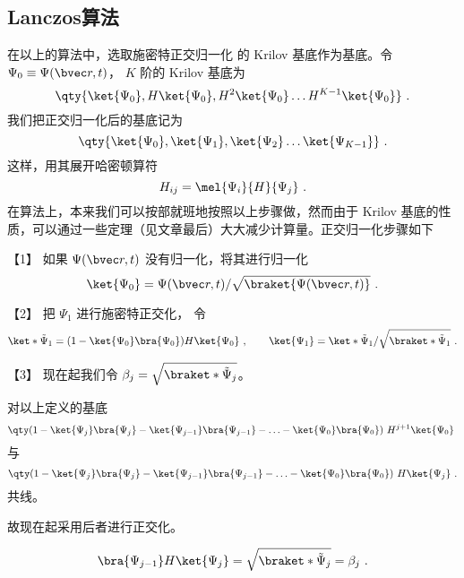 \subsection{Lanczos算法}
在以上的算法中，选取施密特正交归一化 %
的 Krilov 基底作为基底。令 $\Psi_0 \equiv \Psi(\bvec r, t)$，  $K$ 阶的 Krilov 基底为
 \begin{equation}
\qty{ \ket{\Psi_0}, H \ket{\Psi_0}, H^2 \ket{\Psi_0} \dots H^{K-1} \ket{\Psi_0}}~.
\end{equation}
我们把正交归一化后的基底记为
\begin{equation}\label{eq_Lanc_7}
\qty{ \ket{\Psi_0}, \ket{\Psi_1}, \ket{\Psi_2} \dots \ket{\Psi_{K-1}} }~.
\end{equation}
这样，用其展开哈密顿算符
\begin{equation}
H_{ij}=\mel{\Psi_i}{H}{\Psi_j}~.
\end{equation}
在算法上，本来我们可以按部就班地按照以上步骤做，然而由于 Krilov 基底的性质，可以通过一些定理（见文章最后）大大减少计算量。正交归一化步骤如下

【1】 如果 $\Psi(\bvec r,t)$ 没有归一化，将其进行归一化
\begin{equation}
\ket{\Psi_0}=\Psi(\bvec r,t)/\sqrt{\braket{\Psi(\bvec r,t)}}~.
\end{equation}

【2】 把 $\Psi_1$ 进行施密特正交化， 令
\begin{equation}\label{eq_Lanc_31}
\ket*{\tilde\Psi_1} = (1 - \ket{\Psi_0}\bra{\Psi_0})H \ket{\Psi_0}~,
\qquad
\ket{\Psi_1}=\ket*{\tilde\Psi_1}/\sqrt{\braket*{\tilde\Psi_1}}~.
\end{equation}

【3】 现在起我们令 $\beta_j = \sqrt{\braket*{\tilde\Psi_j}}$。 %

\begin{theorem}{}
对以上定义的基底
\begin{equation}
\qty(1 - \ket{\Psi_j} \bra{\Psi_j} - \ket{\Psi_{j - 1}} \bra{\Psi_{j - 1}} - \ldots - \ket{\Psi_0} \bra{\Psi_0})\ H^{j + 1} \ket{\Psi_0}~
\end{equation}
与
\begin{equation}
\qty( 1 - \ket{\Psi_j}\bra{\Psi_j} - \ket{\Psi_{j - 1}}\bra{\Psi_{j - 1}} - \ldots - \ket{\Psi_0}\bra{\Psi_0})\ H \ket{\Psi_j}~.
\end{equation}
共线。
\end{theorem}

故现在起采用后者进行正交化。

\begin{theorem}{}
\begin{equation}\label{eq_Lanc_13}
\bra{\Psi_{j-1}} H \ket{\Psi_j}  = \sqrt{\braket*{\tilde\Psi_j}} = \beta_j~.
\end{equation}
\end{theorem}

